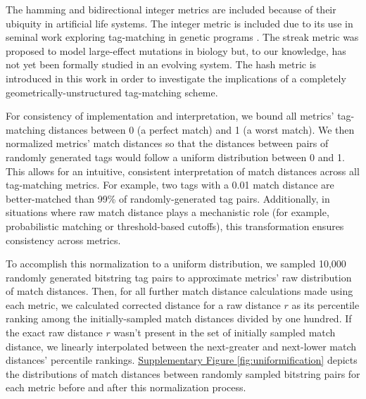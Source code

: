 The hamming and bidirectional integer metrics are included because of their ubiquity in artificial life systems.
The integer metric is included due to its use in seminal work exploring tag-matching in genetic programs \citep{spector2011tag, spector2011s,spector2012tag}.
The streak metric was proposed to model large-effect mutations in biology but, to our knowledge, has not yet been formally studied in an evolving system.
The hash metric is introduced in this work in order to investigate the implications of a completely geometrically-unstructured tag-matching scheme.

For consistency of implementation and interpretation, we bound all metrics' tag-matching distances between 0 (a perfect match) and 1 (a worst match).
We then normalized metrics' match distances so that the distances between pairs of randomly generated tags would follow a uniform distribution between 0 and 1.
This allows for an intuitive, consistent interpretation of match distances across all tag-matching metrics.
For example, two tags with a 0.01 match distance are better-matched than 99\% of randomly-generated tag pairs.
Additionally, in situations where raw match distance plays a mechanistic role (for example, probabilistic matching or threshold-based cutoffs), this transformation ensures consistency across metrics.

To accomplish this normalization to a uniform distribution, we sampled 10,000 randomly generated bitstring tag pairs to approximate metrics' raw distribution of match distances.
Then, for all further match distance calculations made using each metric, we calculated corrected distance for a raw distance $r$ as its percentile ranking among the initially-sampled match distances divided by one hundred.
If the exact raw distance $r$ wasn't present in the set of initially sampled match distance, we linearly interpolated between the next-greater and next-lower match distances' percentile rankings.
\href{doi.org/10.17605/OSF.IO/GW5MC}{Supplementary Figure \ref{fig:uniformification}} depicts the distributions of match distances between randomly sampled bitstring pairs for each metric before and after this normalization process.


